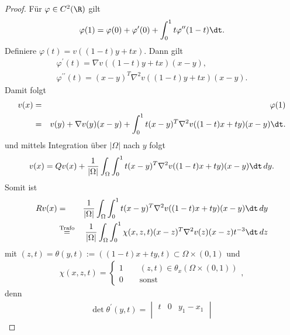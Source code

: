 \begin{proof}
    Für $\varphi\in C^2(\R)$ gilt
    \begin{eqnarray*}
          \varphi(1)
        = \varphi(0) + \varphi^\prime(0) + \int_0^1 t \varphi^{\prime\prime}
          (1-t) \dt.
    \end{eqnarray*}
    Definiere $\varphi(t) = v((1-t) y + tx)$. Dann gilt
    \begin{eqnarray*}
        \varphi^\prime(t) = \nabla v((1-t) y + tx) (x-y), \\
        \varphi^{\prime\prime}(t) = (x-y)^T \nabla^2 v((1-t) y + tx) (x-y).
    \end{eqnarray*}
    Damit folgt
    \begin{eqnarray*}
            v(x)
        &=& \varphi(1) \\
        &=& v(y) + \nabla v(y) (x-y) + \int_0^1 t (x-y)^T \nabla^2
            v((1-t) x + ty) (x-y) \dt.
    \end{eqnarray*}
    und mittels Integration über $|\Omega|$ nach $y$ folgt
    \begin{eqnarray*}
          v(x)
        = Q v(x) + \frac{1}{|\Omega|} \int_\Omega \int_0^1 t (x-y)^T \nabla^2
          v((1-t) x + ty) (x-y) \dt \,dy.
    \end{eqnarray*}
    Somit ist
    \begin{eqnarray*}
            R v(x)
        &=& \frac{1}{|\Omega|} \int_\Omega \int_0^1 t (x-y)^T \nabla^2
            v((1-t) x + ty) (x-y) \dt \,dy \\
        &\stackrel{\text{Trafo}}{=}&
            \frac{1}{|\Omega|} \int_\Omega \int_0^1 \chi(x, z, t) (x-z)^T
            \nabla^2 v(z) (x-z) t^{-3} \dt \,dz
    \end{eqnarray*}
    mit $(z, t) = \theta(y, t) := ((1-t) x +ty, t) \subset \Omega \times
    (0, 1)$
    und
    \begin{eqnarray*}
        \chi(x, z, t) = \begin{cases}
                            1 \qquad (z, t)\in
                            \theta_x (\Omega \times (0,1)) \\
                            0 \qquad \text{sonst}
                        \end{cases},
    \end{eqnarray*}
    denn
    \begin{eqnarray*}
          \det \theta^\prime (y, t)
        = \begin{vmatrix}
              t & 0 & y_1 - x_1 \\

\end{vmatrix}
\end{eqnarray*}
\end{proof}

